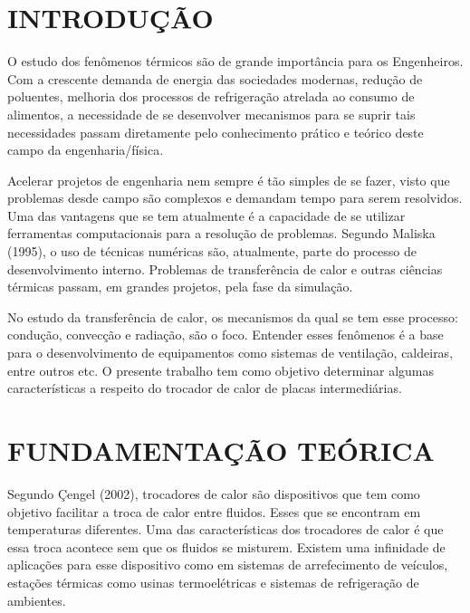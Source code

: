 \documentclass[a4paper,12pt,oneside]{article}
\begin{document}
		
			
\begin{flushright}
\justify
	
	
	\section{\large INTRODUÇÃO}
	\vspace{0.5cm}
	
	O estudo dos fenômenos térmicos são de grande importância para os Engenheiros. Com a crescente demanda de energia das sociedades modernas, redução de poluentes, melhoria dos processos de refrigeração atrelada ao consumo de alimentos, a necessidade de se desenvolver mecanismos para se suprir tais necessidades passam diretamente pelo conhecimento prático e teórico deste campo da engenharia/física.
	
	Acelerar projetos de engenharia nem sempre é tão simples de se fazer, visto que problemas desde campo são complexos e demandam tempo para serem resolvidos. Uma das vantagens que se tem atualmente é a capacidade de se utilizar ferramentas computacionais para a resolução de problemas. Segundo Maliska (1995), o uso de técnicas numéricas são, atualmente, parte do processo de desenvolvimento interno. Problemas de transferência de calor e outras ciências térmicas passam, em grandes projetos, pela fase da simulação.
	
	No estudo da transferência de calor, os mecanismos da qual se tem esse processo: condução, convecção e radiação, são o foco. Entender esses fenômenos é a base para o desenvolvimento de equipamentos como sistemas de ventilação, caldeiras, entre outros etc. O presente trabalho tem como objetivo determinar algumas características a respeito do trocador de calor de placas intermediárias.
	
	\pagebreak
	\clearpage
	\newpage
	
	
\section{\large FUNDAMENTAÇÃO TEÓRICA}
\vspace{0.5cm}

Segundo Çengel (2002), trocadores de calor são dispositivos que tem como objetivo facilitar a troca de calor entre fluidos. Esses que se encontram em temperaturas diferentes. Uma das características dos trocadores de calor é que essa troca acontece sem que os fluidos se misturem. Existem uma infinidade de aplicações para esse dispositivo como em sistemas de arrefecimento de veículos, estações térmicas como usinas termoelétricas e sistemas de refrigeração de ambientes.


\end{flushright}
\end{document}
